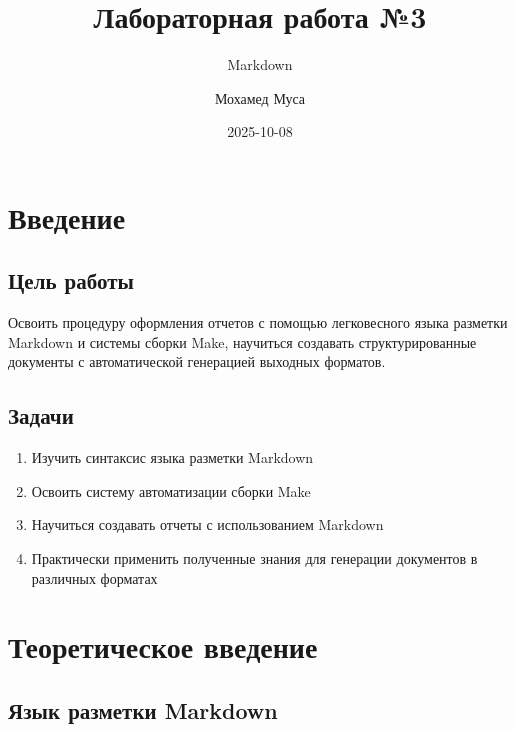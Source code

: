 \documentclass[
  12pt,
  a4paper,
  DIV=11,
  numbers=noendperiod]{scrreprt}
\title{Лабораторная работа №3}
\subtitle{Markdown}
\author{Мохамед Муса}
\date{2025-10-08}
\providecommand{\tightlist}{%
  \setlength{\itemsep}{0pt}\setlength{\parskip}{0pt}}\usepackage{longtable,booktabs,array}
\renewcommand*\contentsname{Содержание}
\newcommand\contentsname{Содержание}
\begin{document}
\maketitle

\renewcommand*\contentsname{Содержание}
{
\setcounter{tocdepth}{1}
\tableofcontents
}
\listoffigures
\listoftables
{}
\chapter{Введение}\label{ux432ux432ux435ux434ux435ux43dux438ux435}

\section{Цель
работы}\label{ux446ux435ux43bux44c-ux440ux430ux431ux43eux442ux44b}

Освоить процедуру оформления отчетов с помощью легковесного языка
разметки Markdown и системы сборки Make, научиться создавать
структурированные документы с автоматической генерацией выходных
форматов.

\section{Задачи}\label{ux437ux430ux434ux430ux447ux438}

\begin{enumerate}
\def\labelenumi{\arabic{enumi}.}
\tightlist
\item
  Изучить синтаксис языка разметки Markdown
\item
  Освоить систему автоматизации сборки Make
\item
  Научиться создавать отчеты с использованием Markdown
\item
  Практически применить полученные знания для генерации документов в
  различных форматах
\end{enumerate}

\chapter{Теоретическое
введение}\label{ux442ux435ux43eux440ux435ux442ux438ux447ux435ux441ux43aux43eux435-ux432ux432ux435ux434ux435ux43dux438ux435}

\section{Язык разметки
Markdown}\label{ux44fux437ux44bux43a-ux440ux430ux437ux43cux435ux442ux43aux438-markdown}
\end{document}
